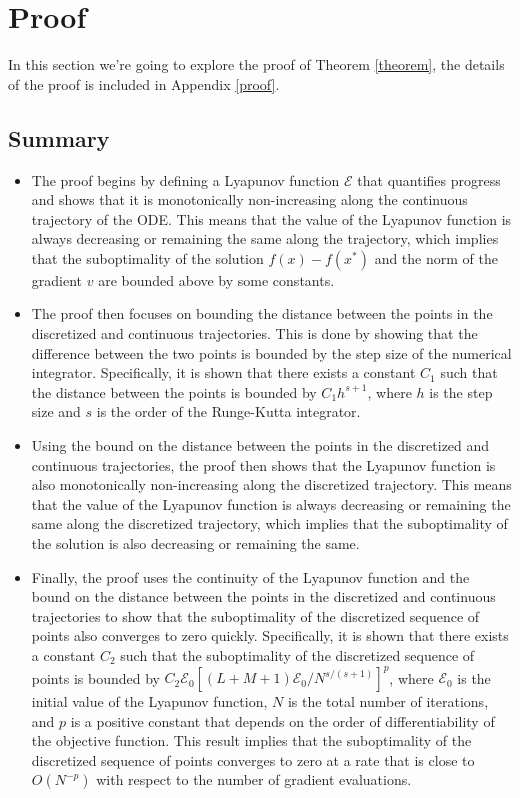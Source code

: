\section{Proof}
In this section we're going to explore the proof of Theorem \ref{theorem}, the details of the proof is included in Appendix \ref{proof}.
\subsection{Summary}
\begin{itemize}
    \item The proof begins by defining a Lyapunov function $\mathcal{E}$ that quantifies progress and shows that it is monotonically non-increasing along the continuous trajectory of the ODE. This means that the value of the Lyapunov function is always decreasing or remaining the same along the trajectory, which implies that the suboptimality of the solution $f(x) - f(x^*)$ and the norm of the gradient $v$ are bounded above by some constants.

    \item The proof then focuses on bounding the distance between the points in the discretized and continuous trajectories. This is done by showing that the difference between the two points is bounded by the step size of the numerical integrator. Specifically, it is shown that there exists a constant $C_1$ such that the distance between the points is bounded by $C_1 h^{s+1}$, where $h$ is the step size and $s$ is the order of the Runge-Kutta integrator.

    \item Using the bound on the distance between the points in the discretized and continuous trajectories, the proof then shows that the Lyapunov function is also monotonically non-increasing along the discretized trajectory. This means that the value of the Lyapunov function is always decreasing or remaining the same along the discretized trajectory, which implies that the suboptimality of the solution is also decreasing or remaining the same.

    \item Finally, the proof uses the continuity of the Lyapunov function and the bound on the distance between the points in the discretized and continuous trajectories to show that the suboptimality of the discretized sequence of points also converges to zero quickly. Specifically, it is shown that there exists a constant $C_2$ such that the suboptimality of the discretized sequence of points is bounded by $C_2 \mathcal{E}_0 [(L+M+1)\mathcal{E}_0/N^{s/(s+1)}]^p$, where $\mathcal{E}_0$ is the initial value of the Lyapunov function, $N$ is the total number of iterations, and $p$ is a positive constant that depends on the order of differentiability of the objective function. This result implies that the suboptimality of the discretized sequence of points converges to zero at a rate that is close to $O(N^{-p})$ with respect to the number of gradient evaluations.
\end{itemize}

